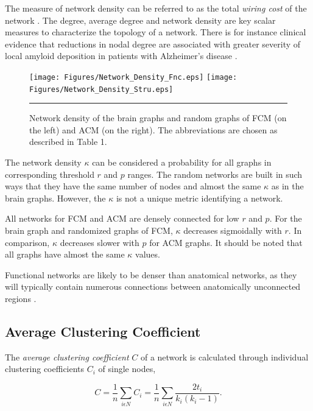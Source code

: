 The measure of network density can be referred to as the total \textit{wiring cost} of the network \citep{RUB10}. The degree, average degree and network density are key scalar measures to characterize the topology of a network. There is for instance clinical evidence that reductions in nodal degree are associated with greater severity of local amyloid deposition in patients with Alzheimer's disease \citep{XYZ2009}. 

\begin{figure}[htbp]
  \centering
	\texttt{[image: Figures/Network\_Density\_Fnc.eps]}
	\texttt{[image: Figures/Network\_Density\_Stru.eps]}  
    \rule{35em}{0.5pt}
    \caption[Network Density]{Network density of the brain graphs and random graphs of FCM (on the left) and ACM (on the right). The abbreviations are chosen as described in Table 1.}
  \label{fig:Network Density}
\end{figure}


The network density $\kappa$ can be considered a probability for all graphs in corresponding threshold $r$ and $p$ ranges. The random networks are built in such ways that they have the same number of nodes and almost the same $\kappa$ as in the brain graphs. However, the $\kappa$ is not a unique metric identifying a network.

All networks for FCM and ACM are densely connected for low $r$ and $p$. For the brain graph and randomized graphs of FCM, $\kappa$ decreases sigmoidally with $r$. In comparison, $\kappa$ decreases slower with $p$ for ACM graphs. It should be noted that all graphs have almost the same $\kappa$ values. 

Functional networks are likely to be denser than anatomical networks, as they will typically contain numerous connections between anatomically unconnected regions \citep{DAM09}. 

\subsection{Average Clustering Coefficient}
    
The \textit{average clustering coefficient} $C$ of a network is calculated through individual clustering coefficients $C_i$ of single nodes,

\begin{equation}
C = \frac{1}{n} \sum\limits_{i\epsilon N}C_i = \frac{1}{n}\sum\limits_{i\epsilon N} \frac{2t_i}{k_i(k_i -1)} .
\end{equation} 

